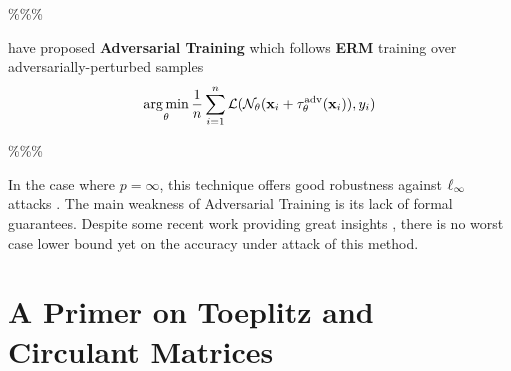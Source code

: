 \%\%\%

\cite{goodfellow2014explaining} have proposed \textbf{Adversarial Training} which follows \textbf{ERM} training over adversarially-perturbed samples
\begin{equation}
  \operatorname*{arg\,min}_{\theta} \frac{1}{n} \sum_{i=1}^{n} \mathcal{L} (\mathcal{N}_\theta (\mathbf{x}_i + \tau_{\theta}^{\mathrm{adv}}(\mathbf{x}_i)), y_i)
\end{equation}


\%\%\%

In the case where $p = \infty$, this technique offers good robustness against $\ell_\infty $ attacks \cite{athalye2018obfuscated}.
The main weakness of Adversarial Training is its lack of formal guarantees.
Despite some recent work providing great insights \cite{sinha2017certifying,zhang2019theoretically}, there is no worst case lower bound yet on the accuracy under attack of this method.





\newpage

\section{A Primer on Toeplitz and Circulant Matrices}
\label{section:ch2-a_primer_on_toeplitz_and_circulant_matrices}

